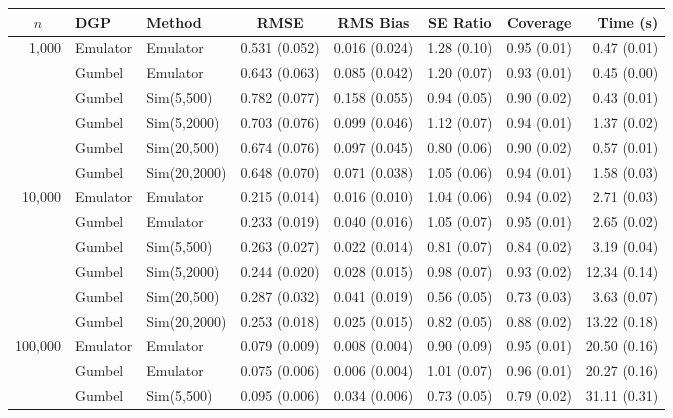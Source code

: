 \begin{table}[htbp]
\centering
\footnotesize
\begin{tabular}{@{}rllrrrrr@{}}
\toprule
\multicolumn{1}{c}{$n$} & \multicolumn{1}{l}{DGP} & \multicolumn{1}{l}{Method} & \multicolumn{1}{c}{RMSE} & \multicolumn{1}{c}{RMS Bias} & \multicolumn{1}{c}{SE Ratio} & \multicolumn{1}{c}{Coverage} & \multicolumn{1}{r}{Time (s)} \\
\midrule
\multirow{6}{*}{1,000} & Emulator & Emulator & 0.531 (0.052) & 0.016 (0.024) & 1.28 (0.10) & 0.95 (0.01) & 0.47 (0.01) \\
 & Gumbel & Emulator & 0.643 (0.063) & 0.085 (0.042) & 1.20 (0.07) & 0.93 (0.01) & 0.45 (0.00) \\
 & Gumbel & Sim(5,500) & 0.782 (0.077) & 0.158 (0.055) & 0.94 (0.05) & 0.90 (0.02) & 0.43 (0.01) \\
 & Gumbel & Sim(5,2000) & 0.703 (0.076) & 0.099 (0.046) & 1.12 (0.07) & 0.94 (0.01) & 1.37 (0.02) \\
 & Gumbel & Sim(20,500) & 0.674 (0.076) & 0.097 (0.045) & 0.80 (0.06) & 0.90 (0.02) & 0.57 (0.01) \\
 & Gumbel & Sim(20,2000) & 0.648 (0.070) & 0.071 (0.038) & 1.05 (0.06) & 0.94 (0.01) & 1.58 (0.03) \\
\midrule
\multirow{6}{*}{10,000} & Emulator & Emulator & 0.215 (0.014) & 0.016 (0.010) & 1.04 (0.06) & 0.94 (0.02) & 2.71 (0.03) \\
 & Gumbel & Emulator & 0.233 (0.019) & 0.040 (0.016) & 1.05 (0.07) & 0.95 (0.01) & 2.65 (0.02) \\
 & Gumbel & Sim(5,500) & 0.263 (0.027) & 0.022 (0.014) & 0.81 (0.07) & 0.84 (0.02) & 3.19 (0.04) \\
 & Gumbel & Sim(5,2000) & 0.244 (0.020) & 0.028 (0.015) & 0.98 (0.07) & 0.93 (0.02) & 12.34 (0.14) \\
 & Gumbel & Sim(20,500) & 0.287 (0.032) & 0.041 (0.019) & 0.56 (0.05) & 0.73 (0.03) & 3.63 (0.07) \\
 & Gumbel & Sim(20,2000) & 0.253 (0.018) & 0.025 (0.015) & 0.82 (0.05) & 0.88 (0.02) & 13.22 (0.18) \\
\midrule
\multirow{6}{*}{100,000} & Emulator & Emulator & 0.079 (0.009) & 0.008 (0.004) & 0.90 (0.09) & 0.95 (0.01) & 20.50 (0.16) \\
 & Gumbel & Emulator & 0.075 (0.006) & 0.006 (0.004) & 1.01 (0.07) & 0.96 (0.01) & 20.27 (0.16) \\
 & Gumbel & Sim(5,500) & 0.095 (0.006) & 0.034 (0.006) & 0.73 (0.05) & 0.79 (0.02) & 31.11 (0.31) \\

\end{tabular}
\end{table}
